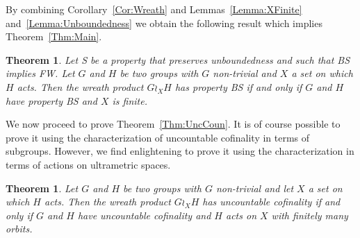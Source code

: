 \documentclass[a4paper]{article}
\newtheorem{thm}[lem]{Theorem}
\theoremstyle{definition}
\theoremstyle{remark}%
\begin{document}
%
%
By combining Corollary~\ref{Cor:Wreath} and Lemmas~\ref{Lemma:XFinite} and~\ref{Lemma:Unboundedness} we obtain the following result which implies Theorem~\ref{Thm:Main}.
%
%
\begin{thm}\label{Thm:Technic}
Let S be a property that preserves unboundedness and such that BS implies FW.
Let $G$ and $H$ be two groups with $G$ non-trivial and $X$ a set on which $H$ acts. Then the wreath product $G \wr_X H$ has property BS if and only if $G$ and $H$ have property BS and $X$ is finite.
\end{thm}
%
%
We now proceed to prove Theorem~\ref{Thm:UncCoun}.
It is of course possible to prove it using the characterization of uncountable cofinality in terms of subgroups. However, we find enlightening to prove it using the characterization in terms of actions on ultrametric spaces.
%
%
\begin{thm}
Let $G$ and $H$ be two groups with $G$ non-trivial and let $X$ a set on which $H$ acts. Then the wreath product $G \wr_X H$ has uncountable cofinality if and only if $G$ and $H$ have uncountable cofinality and $H$ acts on $X$ with finitely many orbits.
\end{thm}
\end{document}
